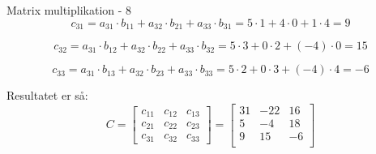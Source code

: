\documentclass{article}
\begin{document}
\begin{exercise}{Matrix multiplikation - 8}
\hint
\[
c_{31} = a_{31} \cdot b_{11} + a_{32} \cdot b_{21} + a_{33} \cdot b_{31} = 5 \cdot 1 + 4 \cdot 0 + 1 \cdot 4 = 9
\]

\hint
\[
c_{32} = a_{31} \cdot b_{12} + a_{32} \cdot b_{22} + a_{33} \cdot b_{32} = 5 \cdot 3 + 0 \cdot 2 + (-4) \cdot 0 = 15
\]

\hint
\[
c_{33} = a_{31} \cdot b_{13} + a_{32} \cdot b_{23} + a_{33} \cdot b_{33} = 5 \cdot 2 + 0 \cdot 3 + (-4) \cdot 4 = -6
\]



\hint
Resultatet er så:
\[
C = \left[\begin{array}{rrr}
c_{11} & c_{12} & c_{13} \\
c_{21} & c_{22} & c_{23} \\
c_{31} & c_{32} & c_{33}
\end{array} \right] =
\left[\begin{array}{rrr}
31 & -22 & 16 \\
5 & -4 & 18 \\
9 & 15 & -6 \\
\end{array} \right]
\]


\end{exercise}

\newpage
\end{document}

